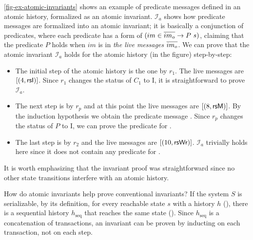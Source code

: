 \documentclass[sigplan,10pt,review,anonymous,screen]{acmart}\settopmatter{printfolios=true,printccs=false,printacmref=false}
\begin{document}
\autoref{fig-ex-atomic-invariants} shows an example of predicate messages defined in an atomic history, formalized as an atomic invariant.
$\mathcal{I}_a$ shows how predicate messages are formalized into an atomic invariant; it is basically a conjunction of predicates, where each predicate has a form of $(im \in \listof{im_o} \to P\ s)$, claiming that the predicate $P$ holds when $im$ is in \emph{the live messages} $\overline{im_o}$.
We can prove that the atomic invariant $\mathcal{I}_a$ holds for the atomic history (in the figure) step-by-step:
\begin{itemize}[leftmargin=*]
\item The initial step of the atomic history is the one by $r_1$. The live messages are $\lbrack (4, \textsf{rsI}) \rbrack$. Since $r_1$ changes the status of $C_1$ to I, it is straightforward to prove $\mathcal{I}_a$.
\item The next step is by $r_p$ and at this point the live messages are $\lbrack (8, \textsf{rsM}) \rbrack$. By the induction hypothesis we obtain the predicate message . Since $r_p$ changes the status of $P$ to I, we can prove the predicate for .
\item The last step is by $r_2$ and the live messages are $\lbrack (10, \textsf{rsWr}) \rbrack$. $\mathcal{I}_a$ trivially holds here since it does not contain any predicate for .
\end{itemize}
It is worth emphasizing that the invariant proof was straightforward since no other state transitions interfere with an atomic history.

How do atomic invariants help prove conventional invariants?
If the system $S$ is serializable, by its definition, for every reachable state $s$ with a history $h$ (), there is a sequential history $h_\textrm{seq}$ that reaches the same state ().
Since $h_\textrm{seq}$ is a concatenation of transactions, an invariant can be proven by inducting on each transaction, not on each step.
\end{document}

